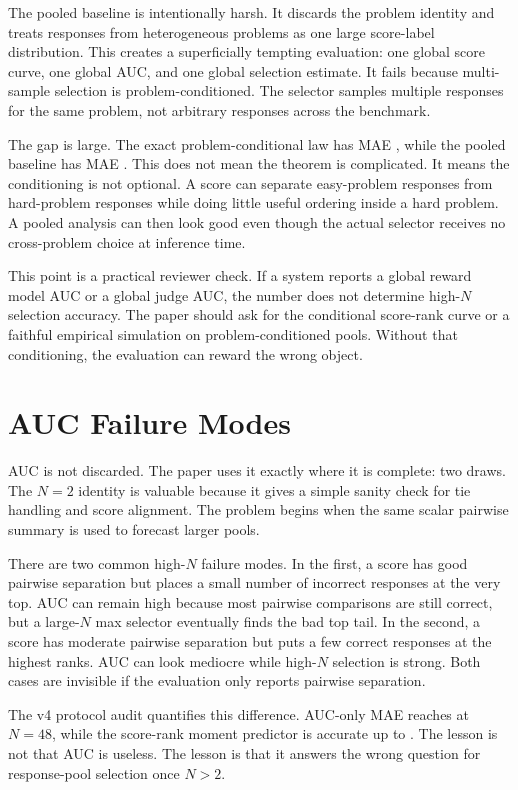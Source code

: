 The pooled baseline is intentionally harsh. It discards the problem identity
and treats responses from heterogeneous problems as one large score-label
distribution. This creates a superficially tempting evaluation: one global
score curve, one global AUC, and one global selection estimate. It fails
because multi-sample selection is problem-conditioned. The selector samples
multiple responses for the same problem, not arbitrary responses across the
benchmark.

The gap is large. The exact problem-conditional law has MAE
\EvidenceCoreMAE{}, while the pooled baseline has MAE \EvidencePooledMAE{}. This
does not mean the theorem is complicated. It means the conditioning is not
optional. A score can separate easy-problem responses from hard-problem
responses while doing little useful ordering inside a hard problem. A pooled
analysis can then look good even though the actual selector receives no
cross-problem choice at inference time.

This point is a practical reviewer check. If a system reports a global reward
model AUC or a global judge AUC, the number does not determine high-$N$
selection accuracy. The paper should ask for the conditional score-rank curve
or a faithful empirical simulation on problem-conditioned pools. Without that
conditioning, the evaluation can reward the wrong object.

\section{AUC Failure Modes}
\label{app:auc-failure}

AUC is not discarded. The paper uses it exactly where it is complete: two
draws. The $N=2$ identity is valuable because it gives a simple sanity check
for tie handling and score alignment. The problem begins when the same scalar
pairwise summary is used to forecast larger pools.

There are two common high-$N$ failure modes. In the first, a score has good
pairwise separation but places a small number of incorrect responses at the
very top. AUC can remain high because most pairwise comparisons are still
correct, but a large-$N$ max selector eventually finds the bad top tail. In the
second, a score has moderate pairwise separation but puts a few correct
responses at the highest ranks. AUC can look mediocre while high-$N$ selection
is strong. Both cases are invisible if the evaluation only reports pairwise
separation.

The v4 protocol audit quantifies this difference. AUC-only MAE reaches
\EvidenceAucNFortyEightMAE{} at $N=48$, while the score-rank moment predictor is
accurate up to \EvidenceMomentMaxMAE{}. The lesson is not that AUC is useless.
The lesson is that it answers the wrong question for response-pool selection
once $N>2$.

